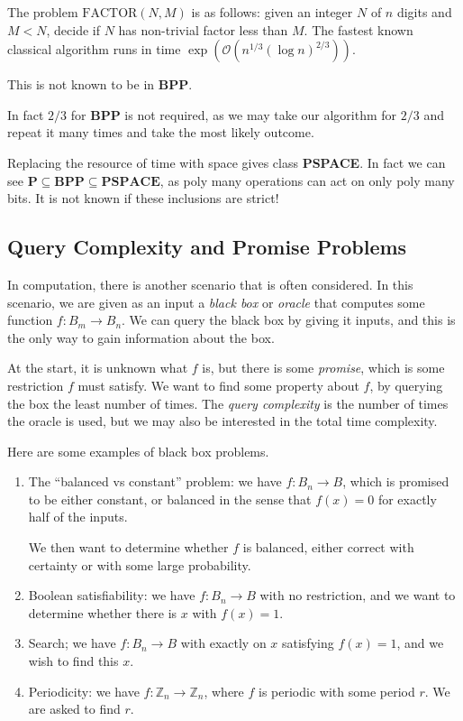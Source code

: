 \documentclass[12pt]{article}
\begin{document}
\begin{exbox}
	The problem $\mathrm{FACTOR}(N, M)$ is as follows: given an integer $N$ of $n$ digits and $M < N$, decide if $N$ has non-trivial factor less than $M$. The fastest known classical algorithm runs in time $\exp( \mathcal{O}(n^{1/3} (\log n)^{2/3}) )$.

	This is not known to be in \textbf{BPP}.
\end{exbox}
In fact $2/3$ for \textbf{BPP} is not required, as we may take our algorithm for $2/3$ and repeat it many times and take the most likely outcome.

Replacing the resource of time with space gives class \textbf{PSPACE}. In fact we can see $\mathbf{P} \subseteq \mathbf{BPP} \subseteq \mathbf{PSPACE}$, as poly many operations can act on only poly many bits. It is not known if these inclusions are strict!

\subsection{Query Complexity and Promise Problems}
\label{sub:qc_pp}

In computation, there is another scenario that is often considered. In this scenario, we are given as an input a \emph{black box} or \emph{oracle} that computes some function $f : B_m \to B_n$. We can query the black box by giving it inputs, and this is the only way to gain information about the box.

At the start, it is unknown what $f$ is, but there is some \emph{promise}, which is some restriction $f$ must satisfy. We want to find some property about $f$, by querying the box the least number of times. The \emph{query complexity} is the number of times the oracle is used, but we may also be interested in the total time complexity.

\begin{exbox}
	Here are some examples of black box problems.
	\begin{enumerate}
		\item The ``balanced vs constant'' problem: we have $f : B_n \to B$, which is promised to be either constant, or balanced in the sense that $f(x) = 0$ for exactly half of the inputs.

			We then want to determine whether $f$ is balanced, either correct with certainty or with some large probability.
		\item Boolean satisfiability: we have $f : B_n \to B$ with no restriction, and we want to determine whether there is $x$ with $f(x) = 1$.
		\item Search; we have $f : B_n \to B$ with exactly on $x$ satisfying $f(x) = 1$, and we wish to find this $x$.
		\item Periodicity: we have $f : \mathbb{Z}_n \to \mathbb{Z}_n$, where $f$ is periodic with some period $r$. We are asked to find $r$.
	\end{enumerate}
\end{exbox}
\end{document}
